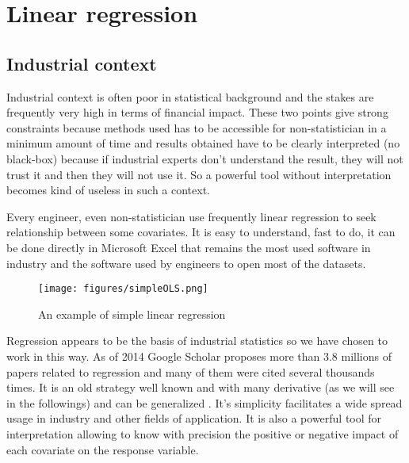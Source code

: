 \documentclass[12pt,a4paper]{report}
\begin{document}
	\section{Linear regression}
%			
		\subsection{Industrial context}
		
			Industrial context is often poor in statistical background and the stakes are frequently very high in terms of financial impact. 
		These two points give strong constraints because methods used has to be accessible for non-statistician in a minimum amount of time and results obtained have to be clearly interpreted (no black-box) because if industrial experts don't understand the result, they will not trust it and then they will not use it. So a powerful tool without interpretation becomes kind of useless in such a context.
		
		Every engineer, even non-statistician use frequently linear regression to seek relationship between some covariates. It is easy to understand, fast to do, it can be done directly in Microsoft Excel that remains the most used software in industry and the software used by engineers to open most of the datasets.
		 
\begin{figure}
\centering
	\texttt{[image: figures/simpleOLS.png]} 
	\caption{An example of simple linear regression}
\end{figure}		 
		 
		 Regression appears to be the basis of industrial statistics so we have chosen to work in this way. As of 2014 Google Scholar proposes more than $3.8$ millions of papers related to regression and many of them were cited several thousands times. It is an old strategy well known and with many derivative (as we will see in the followings) and can be generalized 		 \cite{kiebel2003general,wickens2004general,nelder1972generalized,mccullagh1989generalized} 
. 
		 It's simplicity facilitates a wide spread usage in industry and other fields of application. It is also a powerful tool for interpretation allowing to know with precision the positive or negative impact of each covariate on the response variable. 
	
\end{document}
